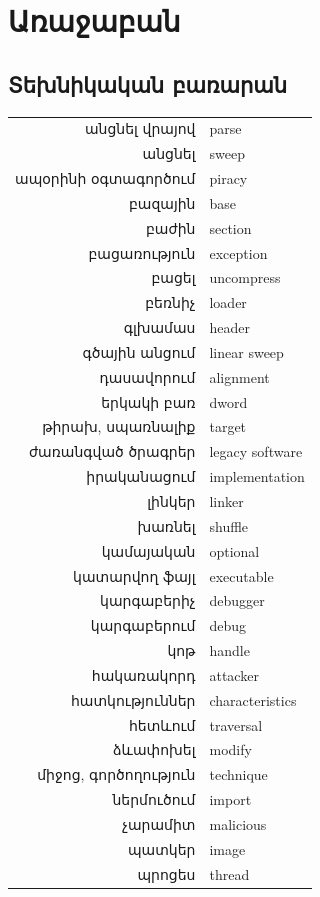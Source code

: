 \documentclass[a4paper,12pt]{article}
\begin{document}
\begin{sloppypar}
\section{Առաջաբան}
\subsection{Տեխնիկական բառարան}

\begin{tabular}{rl}
անցնել վրայով&parse \\
անցնել&sweep \\
ապօրինի օգտագործում&piracy \\
բազային&base \\
բաժին&section \\
բացառություն&exception \\
բացել&uncompress \\
բեռնիչ&loader \\
գլխամաս&header \\
գծային անցում&linear sweep \\
դասավորում&alignment \\
երկակի բառ&dword \\
թիրախ, սպառնալիք&target \\
ժառանգված ծրագրեր&legacy software \\
իրականացում&implementation \\
լինկեր&linker \\
խառնել&shuffle \\
կամայական&optional \\
կատարվող ֆայլ&executable \\
կարգաբերիչ&debugger \\
կարգաբերում&debug \\
կոթ&handle \\
հակառակորդ&attacker \\
հատկություններ&characteristics \\
հետևում&traversal \\
ձևափոխել&modify \\
միջոց, գործողություն&technique \\
ներմուծում&import \\
չարամիտ&malicious \\
պատկեր&image \\
պրոցես&thread \\
\end{tabular}


\end{sloppypar}
\end{document}
